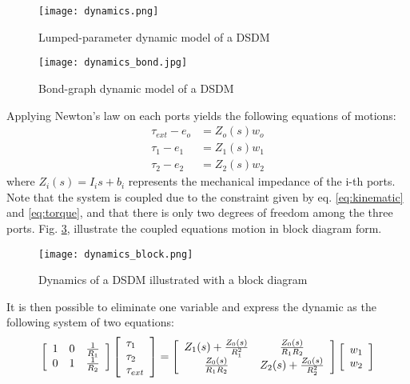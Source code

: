 \begin{figure}[htb]
	\centering
		\texttt{[image: dynamics.png]}
	\caption{Lumped-parameter dynamic model of a DSDM}
	\label{fig:dynamics}
\end{figure}

\begin{figure}[htb]
	\centering
		\texttt{[image: dynamics\_bond.jpg]}
	\caption{Bond-graph dynamic model of a DSDM}
	\label{fig:dynamics_bond}
\end{figure}

Applying Newton's law on each ports yields the following equations of motions:
%
\begin{align}
\tau_{ext}  - e_o &= Z_o(s) w_o \\
\tau_{1}    - e_1 &= Z_1(s) w_1 \\
\tau_{2}    - e_2 &= Z_2(s) w_2
\end{align}
%
where $Z_i(s) = I_i s + b_i$ represents the mechanical impedance of the i-th ports. Note that the system is coupled due to the constraint given by eq. \eqref{eq:kinematic} and \eqref{eq:torque}, and that there is only two degrees of freedom among the three ports. Fig. \ref{fig:dynamics_block}, illustrate the coupled equations motion in block diagram form.
%
\begin{figure}[htp]
	\centering
		\texttt{[image: dynamics\_block.png]}
	\caption{Dynamics of a DSDM illustrated with a block diagram}
	\label{fig:dynamics_block}
\end{figure}
%
It is then possible to eliminate one variable and express the dynamic as the following system of two equations:
%
\begin{align}
\left[
\begin{array}{c c c}
 1 & 0 & \frac{1}{R_1} \\
 0 & 1 & \frac{1}{R_2}
\end{array}
\right]
\left[
\begin{array}{l}
 \tau_{1} \\
 \tau_{2} \\
 \tau_{ext}
\end{array}
\right]
=
\left[
\begin{array}{c c}
 Z_1(s) + \frac{Z_0(s)}{R_1^2} & \frac{Z_0(s)}{R_1 R_2}        \\
 \frac{Z_0(s)}{R_1 R_2}        & Z_2(s) + \frac{Z_0(s)}{R_2^2} \\
\end{array}
\right]
\left[
\begin{array}{l}
w_1     \\
w_2     \\
\end{array}
\right]
\end{align}
